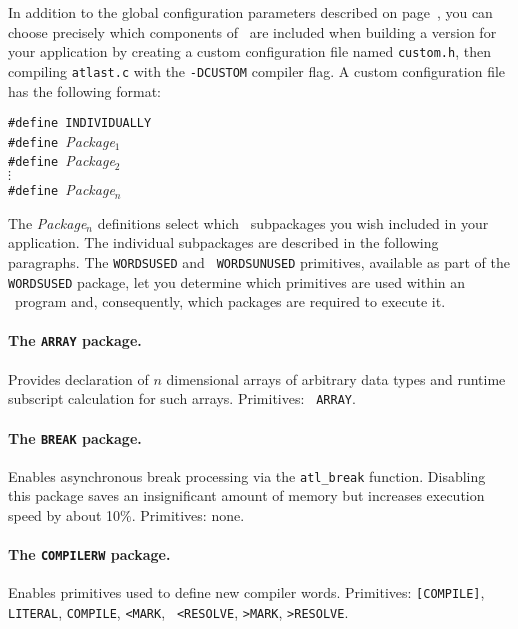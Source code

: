 \documentclass[twocolumn]{article}
\begin{document}
In addition to the global configuration parameters described on
page~\pageref{`gconf'}, you can choose precisely which components of
\atlast\ are included when building a version for your application by
creating a custom configuration file named {\tt custom.h}, then
compiling {\tt atlast.c} with the {\tt -DCUSTOM} compiler flag.  A
custom configuration file has the following format:

\begin{raggedright}
\verb+#define INDIVIDUALLY+\\
\verb+#define +{\em Package$_1$}\\
\verb+#define +{\em Package$_2$}\\
\hspace*{8em} $\vdots$ \\
\verb+#define +{\em Package$_n$}
\end{raggedright}

The {\em Package$_n$} definitions select which \atlast\ subpackages you
wish included in your application.  The individual subpackages are
described in the following paragraphs.  The {\tt WORDSUSED} and {\tt
WORDSUNUSED} primitives, available as part of the {\tt WORDSUSED}
package, let you determine which primitives are used within an \atlast\
program and, consequently, which packages are required to execute it.

\paragraph{The {\tt ARRAY} package.}
Provides declaration of $n$ dimensional arrays of arbitrary data types
and runtime subscript calculation for such arrays.  Primitives: {\tt
ARRAY}.

\paragraph{The {\tt BREAK} package.}
Enables asynchronous break processing via the \verb+atl_break+
function.  Disabling this package saves an insignificant amount of
memory but increases execution speed by about 10\%.  Primitives: none.

\paragraph{The {\tt COMPILERW} package.}
Enables primitives used to define new compiler words.  Primitives:
{\tt [COMPILE]}, {\tt LITERAL}, {\tt COMPILE}, {\tt <MARK}, {\tt
<RESOLVE}, {\tt >MARK}, {\tt >RESOLVE}.
\end{document}
